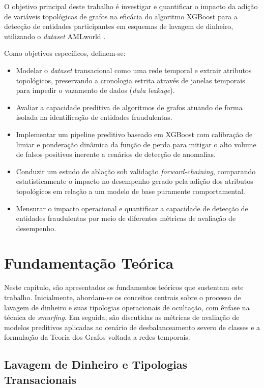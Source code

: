 \documentclass[a4paper,12pt,oneside,onecolumn,final,fleqn]{repUERJ}
\begin{document}
O objetivo principal deste trabalho é investigar e quantificar o impacto da adição de variáveis topológicas de grafos na eficácia do algoritmo XGBoost para a detecção de entidades participantes em esquemas de lavagem de dinheiro, utilizando o \textit{dataset} AMLworld \cite{altman2023realistic}.

Como objetivos específicos, definem-se:
\begin{itemize}
    \item Modelar o \textit{dataset} transacional como uma rede temporal e extrair atributos topológicos, preservando a cronologia estrita através de janelas temporais para impedir o vazamento de dados (\textit{data leakage}).
    \item Avaliar a capacidade preditiva de algoritmos de grafos atuando de forma isolada na identificação de entidades fraudulentas.
    \item Implementar um pipeline preditivo baseado em XGBoost com calibração de limiar e ponderação dinâmica da função de perda para mitigar o alto volume de falsos positivos inerente a cenários de detecção de anomalias.
    \item Conduzir um estudo de ablação sob validação \textit{forward-chaining}, comparando estatisticamente o impacto no desempenho gerado pela adição dos atributos topológicos em relação a um modelo de base puramente comportamental.
    \item Mensurar o impacto operacional e quantificar a capacidade de detecção de entidades fraudulentas por meio de diferentes métricas de avaliação de desempenho.
\end{itemize}

\chapter{Fundamentação Teórica}

Neste capítulo, são apresentados os fundamentos teóricos que sustentam este trabalho. Inicialmente, abordam-se os conceitos centrais sobre o processo de lavagem de dinheiro e suas tipologias operacionais de ocultação, com ênfase na técnica de \textit{smurfing}. Em seguida, são discutidas as métricas de avaliação de modelos preditivos aplicadas ao cenário de desbalanceamento severo de classes e a formulação da Teoria dos Grafos voltada a redes temporais.

\section{Lavagem de Dinheiro e Tipologias Transacionais}
\label{sec:aml_tipologias}
\end{document}
